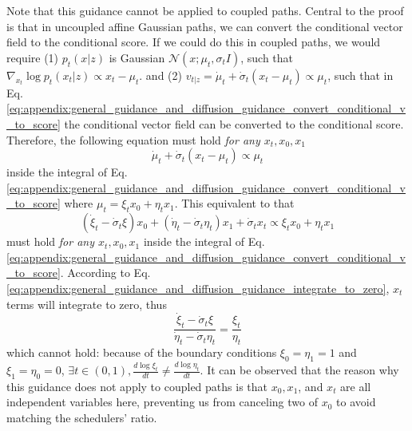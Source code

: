 \begin{remark}
    Note that this guidance cannot be applied to coupled paths. Central to the proof is that in uncoupled affine Gaussian paths, we can convert the conditional vector field to the conditional score.
    If we could do this in coupled paths, we would require (1) $p_t(x|z)$ is Gaussian $\mathcal{N}(x;\mu_t,\sigma_t I)$, such that $\nabla_{x_t} \log p_t(x_t|z) \propto x_t - \mu_t$.  and (2) $v_{t|z}=\dot\mu_t + \dot \sigma_t (x_t - \mu_t) \propto \mu_t$, such that in Eq. \eqref{eq:appendix:general_guidance_and_diffusion_guidance_convert_conditional_v_to_score} the conditional vector field can be converted to the conditional score. Therefore, the following equation must hold \emph{for any $x_t,x_0,x_1$} 
    \begin{equation}
        \dot\mu_t + \dot \sigma_t (x_t - \mu_t) \propto \mu_t
    \end{equation}
    inside the integral of Eq. \eqref{eq:appendix:general_guidance_and_diffusion_guidance_convert_conditional_v_to_score}
    where $\mu_t = \xi_t x_0 + \eta_t x_1$. This equivalent to that
    \begin{equation}
        (\dot\xi_t - \dot \sigma_t \xi) x_0 + (\dot\eta_t - \dot \sigma_t \eta_t) x_1 +  \dot \sigma_t x_t \propto \xi_t x_0 + \eta_t x_1
    \end{equation}
    must hold \emph{for any $x_t,x_0,x_1$} inside the integral of Eq. \eqref{eq:appendix:general_guidance_and_diffusion_guidance_convert_conditional_v_to_score}. According to Eq. \eqref{eq:appendix:general_guidance_and_diffusion_guidance_integrate_to_zero}, $x_t$ terms will integrate to zero, thus
    \begin{equation}
        \frac{\dot\xi_t - \dot \sigma_t \xi}{\dot\eta_t - \dot \sigma_t \eta_t} = \frac{\xi_t}{\eta_t}
    \end{equation}
    which cannot hold: because of the boundary conditions $\xi_0 = \eta_1=1$ and $\xi_1=\eta_0 = 0$, $\exists t\in(0,1),\frac{d \log \xi_t}{ dt} \neq \frac{d \log \eta_t}{ dt}$. %
    It can be observed that the reason why this guidance does not apply to coupled paths is that $x_0,x_1$, and $x_t$ are all independent variables here, preventing us from canceling two of $x_0$ to avoid matching the schedulers' ratio.
    
    
\end{remark}




